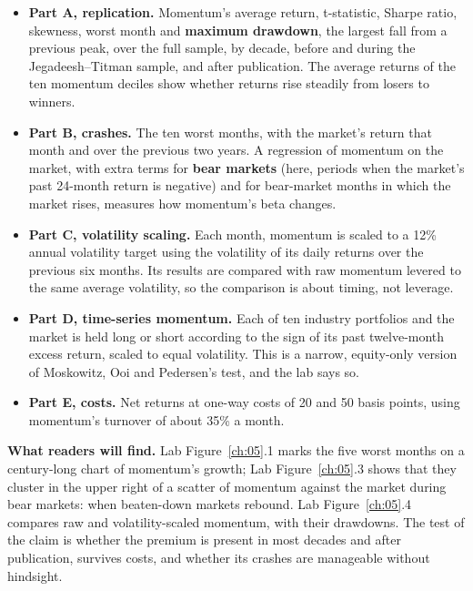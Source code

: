 \begin{itemize}
  \item \textbf{Part A, replication.} Momentum's average return, t-statistic, Sharpe ratio, skewness, worst month and \textbf{maximum drawdown}, the largest fall from a previous peak, over the full sample, by decade, before and during the Jegadeesh--Titman sample, and after publication. The average returns of the ten momentum deciles show whether returns rise steadily from losers to winners.
  \item \textbf{Part B, crashes.} The ten worst months, with the market's return that month and over the previous two years. A regression of momentum on the market, with extra terms for \textbf{bear markets} (here, periods when the market's past 24-month return is negative) and for bear-market months in which the market rises, measures how momentum's beta changes.
  \item \textbf{Part C, volatility scaling.} Each month, momentum is scaled to a 12\% annual volatility target using the volatility of its daily returns over the previous six months. Its results are compared with raw momentum levered to the same average volatility, so the comparison is about timing, not leverage.
  \item \textbf{Part D, time-series momentum.} Each of ten industry portfolios and the market is held long or short according to the sign of its past twelve-month excess return, scaled to equal volatility. This is a narrow, equity-only version of Moskowitz, Ooi and Pedersen's test, and the lab says so.
  \item \textbf{Part E, costs.} Net returns at one-way costs of 20 and 50 basis points, using momentum's turnover of about 35\% a month.
\end{itemize}

\textbf{What readers will find.} Lab Figure~\ref{ch:05}.1 marks the five worst months on a century-long chart of momentum's growth; Lab Figure~\ref{ch:05}.3 shows that they cluster in the upper right of a scatter of momentum against the market during bear markets: when beaten-down markets rebound. Lab Figure~\ref{ch:05}.4 compares raw and volatility-scaled momentum, with their drawdowns. The test of the claim is whether the premium is present in most decades and after publication, survives costs, and whether its crashes are manageable without hindsight.


